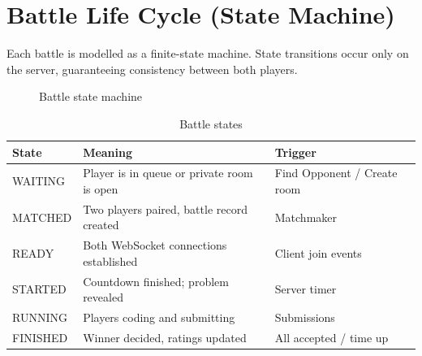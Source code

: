 \documentclass[12pt,a4paper,oneside]{report}
\begin{document}
\section{Battle Life Cycle (State Machine)}
Each battle is modelled as a finite-state machine. State transitions occur only on the server, guaranteeing
consistency between both players.

\begin{figure}[H]
\centering
{}
\caption{Battle state machine}
\label{fig:state}
\end{figure}

\begin{table}[H]
\centering
\small
\begin{tabularx}{\textwidth}{@{}lXl@{}}
\toprule
\textbf{State} & \textbf{Meaning} & \textbf{Trigger} \\
\midrule
WAITING  & Player is in queue or private room is open & Find Opponent / Create room \\
MATCHED  & Two players paired, battle record created  & Matchmaker \\
READY    & Both WebSocket connections established    & Client join events \\
STARTED  & Countdown finished; problem revealed       & Server timer \\
RUNNING  & Players coding and submitting              & Submissions \\
FINISHED & Winner decided, ratings updated            & All accepted / time up \\
\bottomrule
\end{tabularx}
\caption{Battle states}
\end{table}
\end{document}
